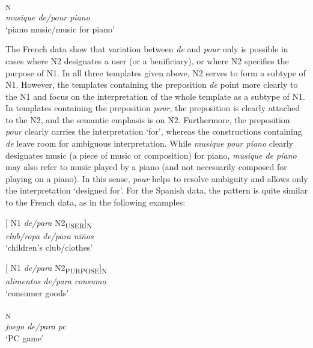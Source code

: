 \documentclass[output=paper]{langsci/langscibook}
\begin{document}
\ea{}\textsubscript{N}\\
\textit{musique de/pour piano}\\
`piano music\slash music for piano'
\z

The French data show that variation between \textit{de} and \textit{pour} only is possible in cases where N2 designates a user (or a benificiary), or where N2 specifies the purpose of N1. In all three templates given above, N2 serves to form a subtype of N1. However, the templates containing the preposition \textit{de} point more clearly to the N1 and focus on the interpretation of the whole template as a subtype of N1. In templates containing the preposition \textit{pour}, the preposition is clearly attached to the N2, and the semantic emphasis is on N2. Furthermore, the preposition \textit{pour} clearly carries the interpretation `for', whereas the constructions containing \textit{de} leave room for ambiguous interpretation. While \textit{musique pour piano} clearly designates music (a piece of music or composition) for piano, \textit{musique de piano} may also refer to music played by a piano (and not necessarily composed for playing on a piano). In this sense, \textit{pour} helps to resolve ambiguity and allows only the interpretation `designed for'. For the Spanish data, the pattern is quite similar to the French data, as in the following examples: 

\begin{exe}\ex\begin{minipage}[t]{0.4\textwidth}    %
[ N1 \textit{de/para} N2\textsubscript{USER}]\textsubscript{N}\\
\textit{club/ropa de/para niños }\\
`children’s club/clothes'
\end{minipage}\hfill%
\begin{minipage}[t]{0.45\textwidth}
[ N1 \textit{de/para} N2\textsubscript{PURPOSE}]\textsubscript{N}\\
\textit{alimentos de/para consumo}\\
`consumer goods'
\end{minipage}\end{exe}

\ea{}\textsubscript{N}\\
\textit{juego de/para pc}\\
`PC game'
\z
\end{document}
